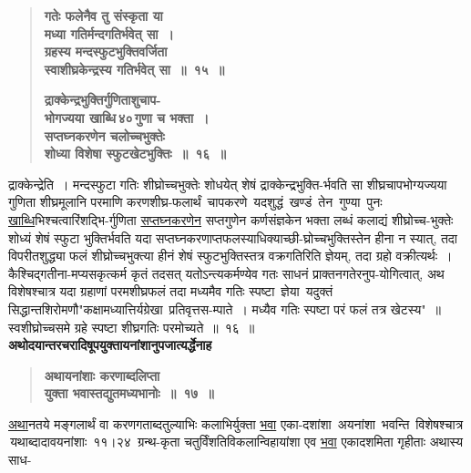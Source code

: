 \documentclass[11pt, openany]{book}
\begin{document}
 \label{2.15}
\begin{quote}
{\large \textbf{{\color{purple}गतेः फलेनैव तु संस्कृता या \\
मध्या गतिर्मन्दगतिर्भवेत् सा~।\\
ग्रहस्य मन्दस्फुटभुक्तिवर्जिता \\
स्वाशीघ्रकेन्द्रस्य गतिर्भवेत् सा~॥~१५~॥}}
\vspace{1mm}

 \label{2.16}
\textbf{{\color{purple}द्राक्केन्द्रभुक्तिर्गुणिताशुचाप-\\
भोगज्यया खाब्धि\textendash \,४०\textendash \,गुणा च भक्ता~। \\
सप्तघ्नकरणेन चलोच्चभुक्तेः \\
शोध्या विशेषा स्फुटखेटभुक्तिः~॥~१६~॥}}}
\end{quote}

\newpage

द्राक्केन्द्रेति~। मन्दस्फुटा गतिः शीघ्रोच्चभुक्तेः शोधयेत् शेषं द्राक्केन्द्रभुक्ति-र्भवति सा शीघ्रचापभोग्यज्यया गुणिता शीघ्रमूलानि परमाणि करणशीघ्र-फलार्थं \,चापकरणे \,यदशुद्धं \,खण्डं \,तेन \,गुण्या \,पुनः \,\hyperref[2.16]{खाब्धि}भिश्चत्वारिंशद्भि-र्गुणिता \hyperref[2.16]{सप्तघ्नकरणेन} सप्तगुणेन कर्णसंज्ञकेन भक्ता लब्धं कलाद्यं शीघ्रोच्च-भुक्तेः शोध्यं शेषं स्फुटा भुक्तिर्भवति यदा सप्तघ्नकरणाप्तफलस्याधिक्याच्छी-घ्रोच्चभुक्तिस्तेन हीना न स्यात्, तदा विपरीतशुद्ध्या फलं शीघ्रोच्चभुक्त्या हीनं शेषं स्फुटभुक्तिस्तत्र वक्रगतिरिति ज्ञेयम्, तदा ग्रहो वक्रीत्यर्थः~। कैश्चिद्गतीना-मप्यसकृत्कर्म कृतं तदसत् यतोऽन्त्यकर्मण्येव गतः साधनं प्राक्तनगतेरनुप-योगित्वात्, अथ विशेषश्चात्र यदा ग्रहाणां परमशीघ्रफलं तदा मध्यमैव गतिः स्पष्टा \,ज्ञेया \,यदुक्तं \,{\color{violet}सिद्धान्तशिरोमणौ\textendash \;"कक्षामध्यात्तिर्यग्रेखा \,प्रतिवृत्तस-म्पाते~। मध्यैव गतिः स्पष्टा परं फलं तत्र खेटस्य"~॥} स्वशीघ्रोच्चसमे ग्रहे स्पष्टा शीघ्रगतिः परमोच्यते~॥~१६~॥\\

{\small \textbf{अथोदयान्तरचरादिषूपयुक्तायनांशानुपजात्यर्द्धेनाह\textendash }}

 \label{2.17}
\begin{quote}
{\large \textbf{{\color{purple}अथायनांशाः करणाब्दलिप्ता \\
युक्ता भवास्तद्युतमध्यभानोः~॥~१७~॥}}}
\end{quote}

\hyperref[2.17]{अथा}नतये मङ्गलार्थं वा करणगताब्दतुल्याभिः कलाभिर्युक्ता \hyperref[2.17]{भवा} एका-दशांशा \,अयनांशा \,भवन्ति \,विशेषश्चात्र \,यथाब्दादावयनांशाः \,११।२४ \,ग्रन्थ-कृता चतुर्विंशतिविकलान्विहायांशा एव \hyperref[2.17]{भवा} एकादशमिता गृहीताः अथास्य साध-
\end{document}
